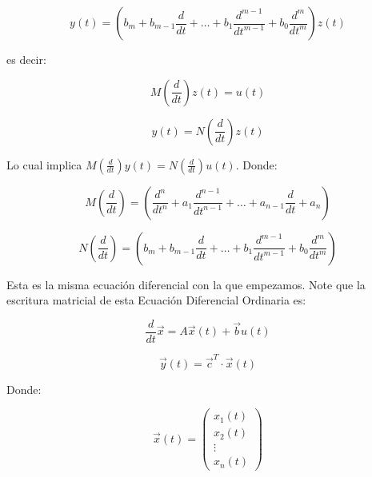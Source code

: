     \begin{equation*}
        y(t) = \left( b_m + b_{m-1} \frac{d}{dt} + \dots + b_1 \frac{d^{m-1}}{dt^{m-1}} + b_0 \frac{d^m}{dt^m} \right) z(t)
    \end{equation*}

    es decir:

    \begin{equation}
        M \left( \frac{d}{dt} \right) z(t) = u(t)
    \end{equation}

    \begin{equation}
        y(t) = N \left( \frac{d}{dt} \right) z(t)
    \end{equation}

    Lo cual implica $M \left( \frac{d}{dt} \right) y(t) = N \left( \frac{d}{dt} \right) u(t)$. Donde:

    \begin{equation*}
        M \left( \frac{d}{dt} \right) = \left( \frac{d^n}{dt^n} + a_1 \frac{d^{n-1}}{dt^{n-1}} + \dots + a_{n-1} \frac{d}{dt} + a_n \right)
    \end{equation*}

    \begin{equation*}
        N \left( \frac{d}{dt} \right) = \left( b_m + b_{m-1} \frac{d}{dt} + \dots + b_1 \frac{d^{m-1}}{dt^{m-1}} + b_0 \frac{d^m}{dt^m} \right)
    \end{equation*}

    Esta es la misma ecuación diferencial con la que empezamos. Note que la escritura matricial de esta Ecuación Diferencial Ordinaria es:

    \begin{equation}
        \frac{d}{dt} \vec{x} = A \vec{x}(t) + \vec{b} u(t)
    \end{equation}

    \begin{equation}
        \vec{y}(t) = \vec{c}^{T} \cdot \vec{x}(t)
    \end{equation}

    Donde:

    \begin{equation}
        \vec{x}(t) =
        \begin{pmatrix}
        x_1(t) \\
        x_2(t) \\
        \vdots \\
        x_n(t)
        \end{pmatrix}
    \end{equation}

